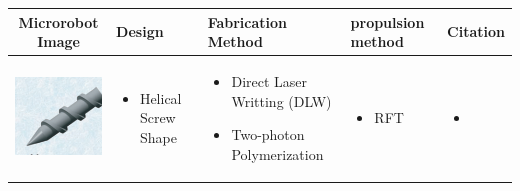 \documentclass[12pt,a4paper,titlepage]{report}
\begin{document}
\begin{table}[h!]
  \centering

\setlength{\arrayrulewidth}{.6mm}
\setlength{\tabcolsep}{1pt}
\renewcommand{\arraystretch}{2.8}


  \begin{tabular}{ c m{2.5cm}  m{4.3cm} m{3cm} m{2cm}}
    \hline
\rowcolor{lightgray}
    Microrobot Image & Design  & Fabrication Method & propulsion method	&Citation  \\ \hline\hline



    \begin{minipage}{.3\textwidth}
      \includegraphics[width=\linewidth, height=25mm]{screw_ta}
    \end{minipage} 
    &
    \begin{minipage}[t]{3cm}
      \begin{itemize}
        \item Helical Screw Shape
    
      \end{itemize}
    \end{minipage}
    & 
    \begin{minipage}{4cm}
      \begin{itemize}
        \item Direct Laser Writting (DLW)
	\item Two-photon Polymerization
   
      \end{itemize}
    \end{minipage}
	&

  \begin{minipage}[t]{3cm}
      \begin{itemize}
        \item RFT
    
      \end{itemize}
    \end{minipage}
	&
	 \begin{minipage}[t]{3cm}
	   \begin{itemize}
        \item \citep{peyer2013magnetic}
   

\end{itemize}
\end{minipage}
\end{tabular}
\end{table}
\end{document}
